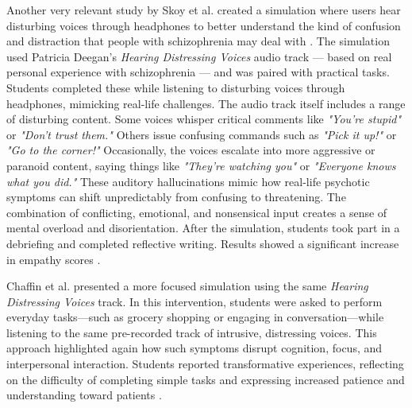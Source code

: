 \vspace{1em}

Another very relevant study by Skoy et al. created a simulation where users hear disturbing voices through headphones to better understand the kind of confusion and distraction that people with schizophrenia may deal with \cite{Skoy2016}. The simulation used Patricia Deegan's \emph{Hearing Distressing Voices} audio track — based on real personal experience with schizophrenia — and was paired with practical tasks. Students completed these while listening to disturbing voices through headphones, mimicking real-life challenges. The audio track itself includes a range of disturbing content. Some voices whisper critical comments like \emph{"You're stupid"} or \emph{"Don't trust them."} Others issue confusing commands such as \emph{"Pick it up!"} or \emph{"Go to the corner!"} Occasionally, the voices escalate into more aggressive or paranoid content, saying things like \emph{"They’re watching you"} or \emph{"Everyone knows what you did."} These auditory hallucinations mimic how real-life psychotic symptoms can shift unpredictably from confusing to threatening. The combination of conflicting, emotional, and nonsensical input creates a sense of mental overload and disorientation. After the simulation, students took part in a debriefing and completed reflective writing. Results showed a significant increase in empathy scores \cite{Skoy2016}.

Chaffin et al. presented a more focused simulation using the same \emph{Hearing Distressing Voices} track. In this intervention, students were asked to perform everyday tasks—such as grocery shopping or engaging in conversation—while listening to the same pre-recorded track of intrusive, distressing voices. This approach highlighted again how such symptoms disrupt cognition, focus, and interpersonal interaction. Students reported transformative experiences, reflecting on the difficulty of completing simple tasks and expressing increased patience and understanding toward patients \cite{Chaffin2013}.

\vspace{1em}

